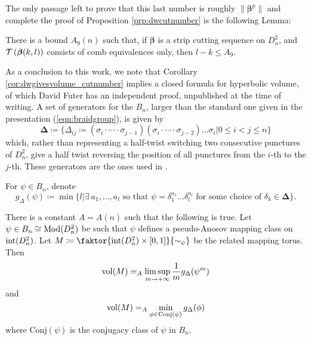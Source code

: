The only passage left to prove that this last number is roughly $\|\bm\beta^p\|$ and complete the proof of Proposition \ref{prp:dwcutnumber} is the following Lemma:

\begin{lemma}
There is a bound $A_9(n)$ such that, if $\bm\beta$ is a strip cutting sequence on $D^2_n$, and ${\mathcal T}\left(\bm\beta(k,l)\right)$ consists of comb equivalences only, then $l-k\leq A_9$.
\end{lemma}

As a conclusion to this work, we note that Corollary \ref{cor:dwgivesvolume_cutnumber} implies a closed formula for hyperbolic volume, of which David Futer has an independent proof, unpublished at the time of writing. A set of generators for the $B_n$, larger than the standard one given in the presentation (\ref{eqn:braidgroup}), is given by
$$\bm\Delta\coloneqq \{\Delta_{ij}\coloneqq (\sigma_i\cdot\cdots\cdot\sigma_{j-1})(\sigma_i\cdot\cdots\cdot\sigma_{j-2})\ldots\sigma_i|0\leq i<j\leq n\}$$
which, rather than representing a half-twist switching two consecutive punctures of $D^2_n$, give a half twist reversing the position of all punctures from the $i$-th to the $j$-th. These generators are the ones used in \cite{dynnikovwiest}.

For $\psi\in B_n$, denote
$$g_\Delta(\psi) \coloneqq \min \{l|\exists\ a_1,\ldots,a_l \mbox{ so that } \psi=\delta_1^{a_1}\ldots\delta_l^{a_l}\mbox{ for some choice of }\delta_k\in \bm\Delta\}.$$

\begin{prop}\label{prp:futervolume}
There is a constant $A=A(n)$ such that the following is true. Let $\psi\in B_n\cong \mathrm{Mod}(D^2_n)$ be such that $\psi$ defines a pseudo-Anosov mapping class on $\mathrm{int}(D^2_n)$. Let $M\coloneqq \faktor{\inte(D^2_n)\times [0,1]}{\sim_\psi}$ be the related mapping torus. Then
$$
\mathrm{vol}(M) =_{A}\limsup_{m\rightarrow+\infty} \frac{1}{m} g_\Delta(\psi^m)
$$
and
$$
\mathrm{vol}(M) =_{A} \min_{\phi\in \mathrm{Conj}(\psi)} g_\Delta(\phi)
$$
where $\mathrm{Conj}(\psi)$ is the conjugacy class of $\psi$ in $B_n$.
\end{prop}

